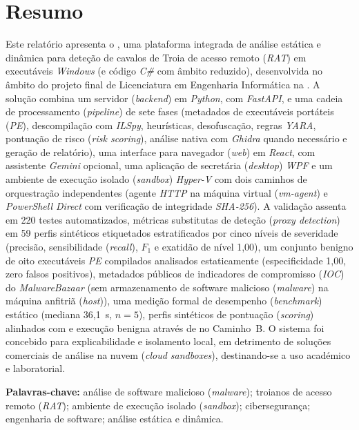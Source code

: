 \chapter*{Resumo}

Este relatório apresenta o \rat{}, uma plataforma integrada de análise estática e dinâmica para
deteção de cavalos de Troia de acesso remoto (\emph{RAT}) em executáveis \emph{Windows} (e código
\emph{C\#} com âmbito reduzido), desenvolvida no âmbito do projeto final de Licenciatura em
Engenharia Informática na \ubi{}. A solução combina um servidor (\emph{backend}) em \emph{Python},
com \emph{FastAPI}, e uma cadeia de processamento (\emph{pipeline}) de sete fases (metadados de
executáveis portáteis (\emph{PE}), descompilação com \emph{ILSpy}, heurísticas, desofuscação, regras
\emph{YARA}, pontuação de risco (\emph{risk scoring}), análise nativa com \emph{Ghidra} quando
necessário e geração de relatório), uma interface para navegador (\emph{web}) em \emph{React}, com
assistente \emph{Gemini} opcional, uma aplicação de secretária (\emph{desktop}) \emph{WPF} e um
ambiente de execução isolado (\emph{sandbox}) \emph{Hyper-V} com dois caminhos de orquestração
independentes (agente \emph{HTTP} na máquina virtual (\emph{vm-agent}) e \emph{PowerShell Direct}
com verificação de integridade \emph{SHA-256}). A validação assenta em 220 testes automatizados,
métricas substitutas de deteção (\emph{proxy detection}) em 59 perfis sintéticos etiquetados
estratificados por cinco níveis de severidade (precisão, sensibilidade (\emph{recall}), $F_1$ e
exatidão de nível 1{,}00), um conjunto benigno de oito executáveis \emph{PE} compilados analisados
estaticamente (especificidade 1{,}00, zero falsos positivos), metadados públicos de indicadores de
compromisso (\emph{IOC}) do \emph{MalwareBazaar} (sem armazenamento de software malicioso
(\emph{malware}) na máquina anfitriã (\emph{host})), uma medição formal de desempenho
(\emph{benchmark}) estático (mediana 36{,}1~s, $n=5$), perfis sintéticos de pontuação
(\emph{scoring}) alinhados com  e execução benigna através de
 no Caminho~B. O sistema foi concebido para explicabilidade e
isolamento local, em detrimento de soluções comerciais de análise na nuvem (\emph{cloud sandboxes}),
destinando-se a uso académico e laboratorial.

\vspace{0.8em}
\noindent\textbf{Palavras-chave:} análise de software malicioso (\emph{malware}); troianos de acesso
remoto (\emph{RAT}); ambiente de execução isolado (\emph{sandbox}); cibersegurança; engenharia de
software; análise estática e dinâmica.
